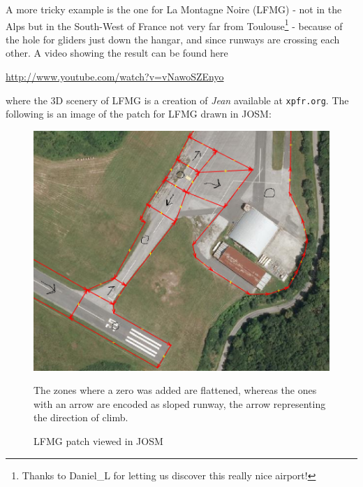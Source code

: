 \documentclass[12pt]{article}
\begin{document}
A more tricky example is the one for La Montagne Noire (LFMG) - not in the Alps but in the South-West of France not very far from Toulouse\footnote{Thanks to Daniel\_L for letting us discover this really nice airport!} - because of the hole for gliders just down the hangar, and since runways are crossing each other.  A video showing the result can be found here
\begin{center}
\href{\tt http://www.youtube.com/watch?v=vNawoSZEnyo}{http://www.youtube.com/watch?v=vNawoSZEnyo}
\end{center}
where the 3D scenery of LFMG is a creation of {\it Jean} available at {\tt xpfr.org}.
The following is an image of the patch for LFMG drawn in JOSM:
\begin{center}
\begin{figure}[!ht]
\begin{center}
\includegraphics[width=16cm]{Images/LFMG_patch.png}
\caption{\label{fig:LFMG_patch}LFMG patch viewed in JOSM}
\end{center}
The zones where a zero was added are flattened, whereas the ones with an arrow are encoded
as sloped runway, the arrow representing the direction of climb.
\end{figure}
\end{center}
\end{document}

